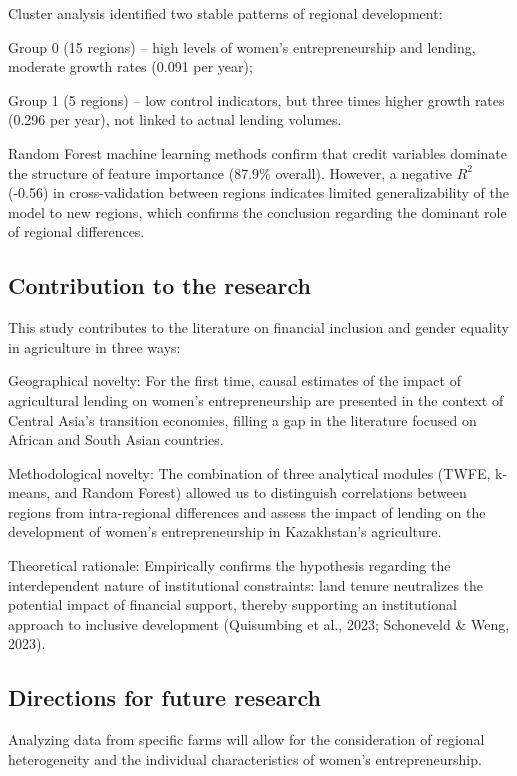 ﻿\documentclass[sn-mathphys-num]{sn-jnl}
\newcommand{\hl}[1]{#1}
\begin{document}
Cluster analysis identified two stable patterns of regional development:

Group 0 (15 regions) -- high levels of women's entrepreneurship and
lending, moderate growth rates (0.091 per year);

Group 1 (5 regions) -- low control indicators, but three times higher
growth rates (0.296 per year), not linked to actual lending volumes.

Random Forest machine learning methods confirm that credit variables
dominate the structure of feature importance (87.9\% overall). However,
a negative $R^2$ (-0.56) in cross-validation between regions indicates
limited generalizability of the model to new regions, which confirms the
conclusion regarding the dominant role of regional differences.

\subsection{Contribution to the research}

This study contributes to the literature on financial inclusion and
gender equality in agriculture in three ways:

Geographical novelty: For the first time, causal estimates of the impact
of agricultural lending on women's entrepreneurship are presented in the
context of Central Asia's transition economies, filling a gap in the
literature focused on African and South Asian countries.

Methodological novelty: The combination of three analytical modules
(TWFE, k-means, and Random Forest) allowed us to distinguish
correlations between regions from intra-regional differences and assess
the impact of lending on the development of women's entrepreneurship in
Kazakhstan's agriculture.

Theoretical rationale: Empirically confirms the hypothesis regarding the
interdependent nature of institutional constraints: land tenure
neutralizes the potential impact of financial support, thereby
supporting an institutional approach to inclusive development
(\hl{Quisumbing et al., 2023; Schoneveld \& Weng, 2023}).

\subsection{Directions for future research}

Analyzing data from specific farms will allow for the consideration of
regional heterogeneity and the individual characteristics of women's
entrepreneurship.
\end{document}

